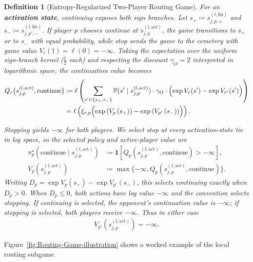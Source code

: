 \documentclass[twoside]{article}
\renewcommand{\P}{\mathbb{P}}
\newcommand{\1}{\mathbf{1}}
\newtheorem{definition}{Definition}
\begin{document}
\begin{definition}[Entropy-Regularized Two-Player Routing Game]
For an \textbf{activation state}, continuing exposes both sign branches. Let $s_+ \coloneqq
    s_{j,p,+}^{(l, \text{lin})}$ and $s_- \coloneqq s_{j,p',-}^{(l, \text{lin})}$. If player $p$
chooses \emph{continue} at $s_{j,p}^{(l, act)}$, the game transitions to $s_+$ or to $s_-$ with
equal probability, while \emph{stop} sends the game to the cemetery with game value
$V_r(\dagger)=\ell(0)=-\infty$. Taking the expectation over the uniform sign-branch kernel
($\frac{1}{2}$ each) and respecting the discount $\gamma_O = 2$ interpreted in logarithmic space,
the continuation value becomes
\begin{align}\label{eq:routing-activation-continue}
    Q_r \bigl( s_{j,p}^{(l, act)}, \mathrm{continue} \bigr)
    &\coloneqq
    \ell \left( \sum_{s' \in \{s_+, s_-\}} \P(s' \mid s_{j,p}^{(l, act)}) \cdot \gamma_{\mathrm{O}}
    \cdot \Bigl( \exp V_r(s') - \exp V_{r'}(s') \Bigr) \right) \nonumber \\
    &= \ell \left(
    \xi_{r,p} \Bigl( \exp\left( V_p\left( s_+ \right) \right) - \exp\left( V_{p'}\left( s_- \right)
    \right) \Bigr)
    \right).
\end{align}

Stopping yields $-\infty$ for both players. We select \emph{stop at every activation-state tie in log space}, so the selected policy and active-player value are
\begin{align}\label{eq:routing-activation-value}
    \pi_p^\star(\mathrm{continue}\mid s_{j,p}^{(l,\mathrm{act})})
    &\coloneqq \1\!\left[Q_p(s_{j,p}^{(l,\mathrm{act})},\mathrm{continue})>-\infty\right],\\
    V_p(s_{j,p}^{(l,\mathrm{act})})
    &\coloneqq \max\{-\infty,Q_p(s_{j,p}^{(l,\mathrm{act})},\mathrm{continue})\}.
\end{align}
Writing $D_p=\exp V_p(s_+)-\exp V_{p'}(s_-)$, this selects continuing exactly when $D_p>0$. When $D_p\leq0$, both actions have log value $-\infty$ and the convention selects stopping. If continuing is selected, the opponent's continuation value is $-\infty$; if stopping is selected, both players receive $-\infty$. Thus in either case
\begin{align}
    V_{p'}(s_{j,p}^{(l,\mathrm{act})})=-\infty.
\end{align}
\end{definition}
Figure~\ref{fig:Routing-Game-illustration} shows a worked example of the local routing subgame.
\end{document}
